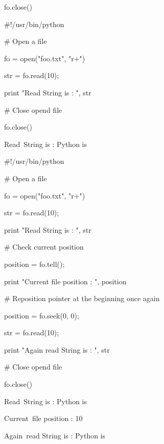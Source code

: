 \noindent 
fo.close() \par
\noindent 
 $  \#  $!/usr/bin/python \par
\vspace{12pt}
\noindent 
 $  \#  $ Open a file \par
\noindent 
fo = open("foo.txt", "r+") \par
\noindent 
str = fo.read(10); \par
\noindent 
print "Read String is : ", str \par
\vspace{12pt}
\noindent 
 $  \#  $ Close opend file \par
\noindent 
fo.close() \par
\vspace{12pt}
\noindent 
Read~String is :  Python is \par
\vspace{12pt}
\noindent 
 $  \#  $!/usr/bin/python \par
\vspace{12pt}
\noindent 
 $  \#  $ Open a file \par
\noindent 
fo = open("foo.txt", "r+") \par
\noindent 
str = fo.read(10); \par
\noindent 
print "Read String is : ", str \par
\vspace{12pt}
\noindent 
 $  \#  $ Check current position \par
\noindent 
position = fo.tell(); \par
\noindent 
print "Current file position : ", position \par
\vspace{12pt}
\noindent 
 $  \#  $ Reposition pointer at the beginning once again \par
\noindent 
position = fo.seek(0, 0); \par
\noindent 
str = fo.read(10); \par
\noindent 
print "Again read String is : ", str \par
\noindent 
 $  \#  $ Close opend file \par
\noindent 
fo.close() \par
\vspace{12pt}
\noindent 
Read~String is :  Python is \par
\noindent 
Current~file position :  10 \par
\noindent 
Again~read String is :  Python is \par
\vspace{12pt}
